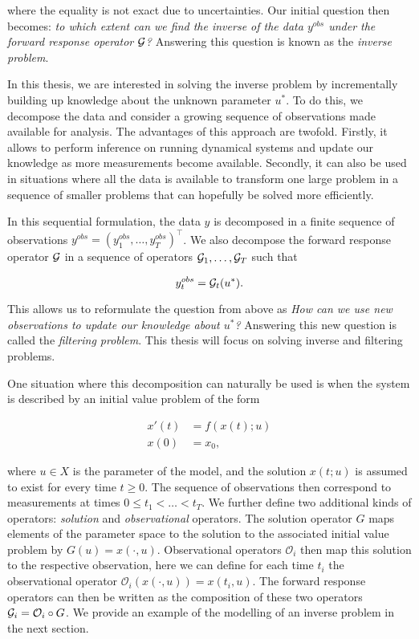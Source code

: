 where the equality is not exact due to uncertainties. Our initial question then becomes: \textit{to which extent can we find the inverse of the data $y^{obs}$ under the forward response operator $\mathcal{G}$?} Answering this question is known as the \textit{inverse problem}.

In this thesis, we are interested in solving the inverse problem by incrementally building up knowledge about the unknown parameter $u^*$. To do this, we decompose the data and consider a growing sequence of observations made available for analysis. The advantages of this approach are twofold. Firstly, it allows to perform inference on running dynamical systems and update our knowledge as more measurements become available. Secondly, it can also be used in situations where all the data is available to transform one large problem in a sequence of smaller problems that can hopefully be solved more efficiently.

In this sequential formulation, the data $y$ is decomposed in a finite sequence of observations $y^{obs} = (y^{obs}_1, \ldots, y^{obs}_T)^\top$. We also decompose the forward response operator $\mathcal{G}$ in a sequence of operators $\mathcal{G}_1, \ldots, \mathcal{G}_T$ such that

\begin{equation*}
  y^{obs}_t = \mathcal{G}_t(u^*).
\end{equation*}

This allows us to reformulate the question from above as \textit{How can we use new observations to update our knowledge about $u^*$?} Answering this new question is called the \textit{filtering problem}. This thesis will focus on solving inverse and filtering problems.

One situation where this decomposition can naturally be used is when the system is described by an initial value problem of the form

\begin{equation}
  \begin{aligned}
    x'(t) &= f(x(t); u)\\
    x(0) &= x_0,
  \end{aligned}
\end{equation}  

where $u \in X$ is the parameter of the model, and the solution $x(t; u)$ is assumed to exist for every time $t \geq 0$. The sequence of observations then correspond to measurements at times  $0 \leq t_1 < \ldots < t_T$. We further define two additional kinds of operators: \textit{solution} and \textit{observational} operators. The solution operator $G$ maps elements of the parameter space to the solution to the associated initial value problem by $G(u) = x(\cdot, u)$. Observational operators $\mathcal{O}_i$ then map this solution to the respective observation, here we can define for each time $t_i$ the observational operator $\mathcal{O}_i(x(\cdot, u)) = x(t_i, u)$. The forward response operators can then be written as the composition of these two operators $\mathcal{G}_i = \mathcal{O}_i \circ G$. We provide an example of the modelling of an inverse problem in the next section.

